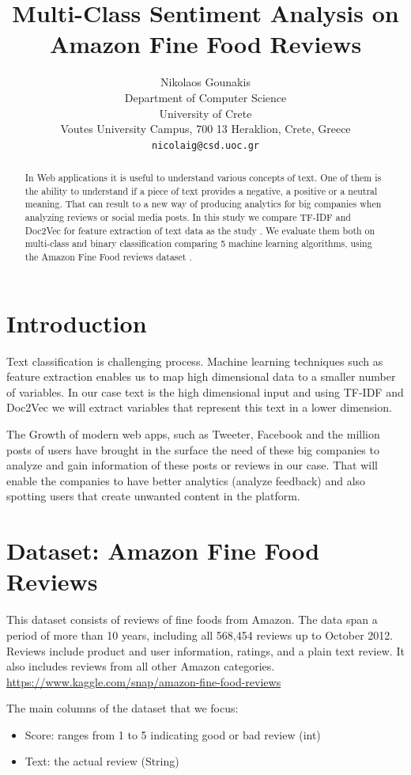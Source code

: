 \documentclass{article}
\title{Multi-Class Sentiment Analysis on Amazon Fine Food Reviews}
\author{%
  Nikolaos Gounakis\\
  Department of Computer Science\\
  University of Crete\\
  Voutes University Campus, 700 13 Heraklion, Crete, Greece\\
  \texttt{nicolaig@csd.uoc.gr} \\
}
\begin{document}
\maketitle

\begin{abstract}
In Web applications it is useful to understand various concepts of text. 
One of them is the ability to understand if a piece of text provides a negative,
a positive or a neutral meaning. That can result to a new way of producing analytics 
for big companies when analyzing reviews or social media posts. In this study we compare
TF-IDF \cite{tfidf} and Doc2Vec \cite{doc2vec} for feature extraction of text data as 
the study \cite{studyPaper}. We evaluate them both on multi-class and binary classification
comparing 5 machine learning algorithms, using the Amazon Fine Food reviews 
dataset \cite{amzfood}.
\end{abstract}

\section{Introduction}
Text classification is challenging process. Machine learning techniques 
such as feature extraction enables us to map high dimensional data to a smaller 
number of variables. In our case text is the high dimensional input and using 
TF-IDF and Doc2Vec we will extract variables that represent this text in a 
lower dimension.

The Growth of modern web apps, such as Tweeter, Facebook and the million 
posts of users have brought in the surface the need of these big companies to 
analyze and gain information of these posts or reviews in our case. That will
enable the companies to have better analytics (analyze feedback) and also 
spotting users that create unwanted content in the platform. 

\section{Dataset: Amazon Fine Food Reviews}
\label{Dataset}
This dataset consists of reviews of fine foods from Amazon. 
The data span a period of more than 10 years, including all 568,454 reviews 
up to October 2012. Reviews include product and user information, ratings, and a plain text review. 
It also includes reviews from all other Amazon categories.
\url{https://www.kaggle.com/snap/amazon-fine-food-reviews}

The main columns of the dataset that we focus:
\begin{itemize}
  \item Score: ranges from 1 to 5 indicating good or bad review (int)
  \item Text: the actual review (String)
\end{itemize}
\end{document}
